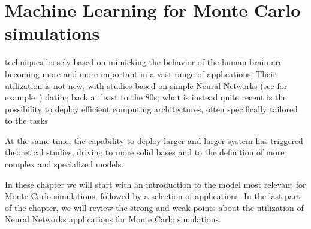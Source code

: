 \chapter{Machine Learning for Monte Carlo simulations}
 techniques loosely based on mimicking the behavior of the human brain are becoming more and more important in a vast range of applications.
Their utilization is not new, with studies based on simple Neural Networks (see for example~\cite{nn1,nn2,nn3}) dating back at least to the 80s; what is instead quite recent is the possibility to deploy efficient computing architectures, often specifically tailored to the tasks

At the same time, the capability to deploy larger and larger system has triggered theoretical studies, driving to more solid bases and to  the definition of more complex and specialized models.

In these chapter we will start with an introduction to the model most relevant for Monte Carlo simulations, followed by a selection of applications. In the last part of the chapter, we will review the strong and weak points about the utilization of Neural Networks applications for Monte Carlo simulations.
